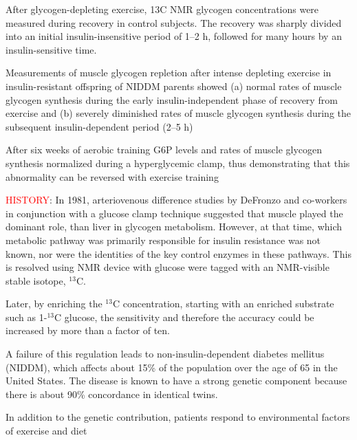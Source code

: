 \begin{itemize}
  After glycogen-depleting exercise, 13C NMR glycogen concentrations were
  measured during recovery in control subjects.
  The recovery was sharply divided into an initial insulin-insensitive period of
  1–2 h, followed for many hours by an insulin-sensitive time.
  
  Measurements of muscle glycogen repletion after intense depleting exercise in
  insulin-resistant offspring of NIDDM parents showed (a) normal rates of muscle
  glycogen synthesis during the early insulin-independent phase of recovery from
  exercise and (b) severely diminished rates of muscle glycogen synthesis during
  the subsequent insulin-dependent period (2–5 h)
  
  After six weeks of aerobic training G6P levels and rates of muscle glycogen
  synthesis normalized during a hyperglycemic clamp, thus demonstrating that
  this abnormality can be reversed with exercise training
  
  
  
   
  
\end{itemize}


\textcolor{red}{HISTORY}: In 1981, arteriovenous difference studies by DeFronzo
and co-workers in conjunction with a glucose clamp technique suggested that
muscle played the dominant role, than liver in glycogen metabolism.
However, at that time, which metabolic pathway was primarily responsible for
insulin resistance was not known, nor were the identities of the key control
enzymes in these pathways. This is resolved using NMR device with glucose were
tagged with an NMR-visible stable isotope, $^{13}$C.

Later, by enriching the $^{13}$C concentration, starting with an enriched
substrate such as 1-$^{13}$C glucose, the sensitivity and therefore the accuracy
could be increased by more than a factor of ten.




\begin{mdframed}

A failure of this regulation leads to non-insulin-dependent diabetes mellitus
(NIDDM), which affects about 15\% of the population over the age of 65 in the United
States. The disease is known to have a strong genetic component because there is
about 90\% concordance in identical twins.

In addition to the genetic contribution, patients respond to environmental
factors of exercise and diet

\end{mdframed}

